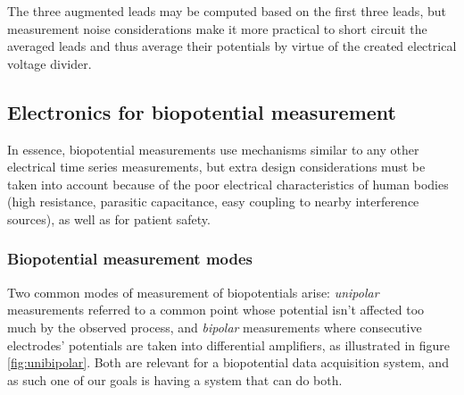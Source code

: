 \documentclass{thesis}
\begin{document}
The three augmented leads may be computed based on the first three leads, but measurement noise considerations make it more practical to short circuit the averaged leads and thus average their potentials by virtue of the created electrical voltage divider.

\subsection{Electronics for biopotential measurement}

In essence, biopotential measurements use mechanisms similar to any other electrical time series measurements, but extra design considerations must be taken into account because of the poor electrical characteristics of human bodies (high resistance, parasitic capacitance, easy coupling to nearby interference sources), as well as for patient safety.

\subsubsection{Biopotential measurement modes}

Two common modes of measurement of biopotentials arise: \textit{unipolar} measurements referred to a common point whose potential isn't affected too much by the observed process, and \textit{bipolar} measurements where consecutive electrodes' potentials are taken into differential amplifiers, as illustrated in figure \ref{fig:unibipolar}. Both are relevant for a biopotential data acquisition system, and as such one of our goals is having a system that can do both.
\end{document}
